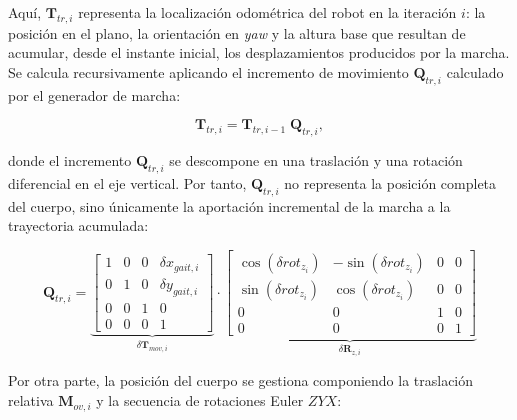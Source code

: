 Aquí, $\mathbf{T}_{tr,i}$ representa la localización odométrica del robot en la iteración $i$: la posición en el plano, la orientación en \textit{yaw} y la altura base que resultan de acumular, desde el instante inicial, los desplazamientos producidos por la marcha. Se calcula recursivamente aplicando el incremento de movimiento $\mathbf{Q}_{tr,i}$ calculado por el generador de marcha:

\vspace{-1\baselineskip}
\begin{equation}
    \mathbf{T}_{tr,i} = \mathbf{T}_{tr,i-1} \; \mathbf{Q}_{tr,i},
    \label{eq:Ttr_rec}
\end{equation}
\vspace{-1.0\baselineskip}

donde el incremento $\mathbf{Q}_{tr,i}$ se descompone en una traslación y una rotación diferencial en el eje vertical. Por tanto, $\mathbf{Q}_{tr,i}$ no representa la posición completa del cuerpo, sino únicamente la aportación incremental de la marcha a la trayectoria acumulada:

\vspace{-0.5\baselineskip}
\begin{equation}
    \mathbf{Q}_{tr,i} = 
    \underbrace{
    \begin{bmatrix}
        1 & 0 & 0 & \delta x_{gait,i} \\
        0 & 1 & 0 & \delta y_{gait,i} \\
        0 & 0 & 1 & 0 \\
        0 & 0 & 0 & 1
    \end{bmatrix}
    }_{\delta\mathbf{T}_{mov,i}}
    \cdot
    \underbrace{
    \begin{bmatrix}
        \cos(\delta rot_{z_{i}}) & -\sin(\delta rot_{z_{i}}) & 0 & 0 \\
        \sin(\delta rot_{z_{i}}) & \cos(\delta rot_{z_{i}})  & 0 & 0 \\
        0 & 0 & 1 & 0 \\
        0 & 0 & 0 & 1
    \end{bmatrix}
    }_{\delta\mathbf{R}_{z,i}}
    \label{eq:Qtr}
\end{equation}
\vspace{-0.5\baselineskip}

Por otra parte, la posición del cuerpo se gestiona componiendo la traslación relativa $\mathbf{M}_{ov,i}$ y la secuencia de rotaciones Euler $ZYX$: 

